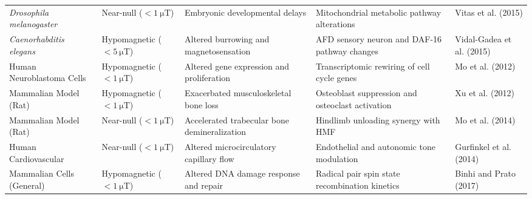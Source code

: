 \begin{table}[t]
\begin{tabular}{p{2.8cm}p{2.2cm}p{3.4cm}p{4.4cm}p{3.0cm}}
\textit{Drosophila melanogaster} & Near-null ($<\SI{1}{\micro\tesla}$) & Embryonic developmental delays & Mitochondrial metabolic pathway alterations & Vitas et al. (2015) \citep{Vitas2015} \\
\textit{Caenorhabditis elegans} & Hypomagnetic ($<\SI{5}{\micro\tesla}$) & Altered burrowing and magnetosensation & AFD sensory neuron and DAF-16 pathway changes & Vidal-Gadea et al. (2015) \citep{VidalGadea2015} \\
Human Neuroblastoma Cells & Hypomagnetic ($<\SI{1}{\micro\tesla}$) & Altered gene expression and proliferation & Transcriptomic rewiring of cell cycle genes & Mo et al. (2012) \citep{Mo2012} \\
Mammalian Model (Rat) & Hypomagnetic ($<\SI{1}{\micro\tesla}$) & Exacerbated musculoskeletal bone loss & Osteoblast suppression and osteoclast activation & Xu et al. (2012) \citep{Xu2012} \\
Mammalian Model (Rat) & Near-null ($<\SI{1}{\micro\tesla}$) & Accelerated trabecular bone demineralization & Hindlimb unloading synergy with HMF & Mo et al. (2014) \citep{Mo2014} \\
Human Cardiovascular & Near-null ($<\SI{1}{\micro\tesla}$) & Altered microcirculatory capillary flow & Endothelial and autonomic tone modulation & Gurfinkel et al. (2014) \citep{Gurfinkel2014} \\
Mammalian Cells (General) & Hypomagnetic ($<\SI{1}{\micro\tesla}$) & Altered DNA damage response and repair & Radical pair spin state recombination kinetics & Binhi and Prato (2017) \citep{Binhi2017} \\
\bottomrule
\end{tabular}
\end{table}
